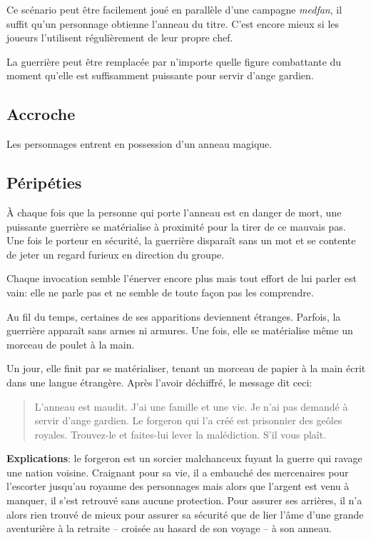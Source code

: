 \documentclass[a5paper,pagesize,10pt,bibliography=totoc,numbers=enddot,
headings=normal,DIV=9,twoside=false,tablecaptionabove]{scrbook}
\begin{document}
Ce scénario peut être facilement joué en parallèle d'une campagne \emph{medfan}, il suffit qu'un personnage obtienne l'anneau du titre.
C'est encore mieux si les joueurs l'utilisent régulièrement de leur propre chef.

La guerrière peut être remplacée par n'importe quelle figure combattante du moment qu'elle est suffisamment puissante pour servir d'ange gardien.

\subsection*{Accroche}

Les personnages entrent en possession d'un anneau magique.

\subsection*{Péripéties}

À chaque fois que la personne qui porte l'anneau est en danger de mort, une puissante guerrière se matérialise à proximité pour la tirer de ce mauvais pas.
Une fois le porteur en sécurité, la guerrière disparaît sans un mot et se contente de jeter un regard furieux en direction du groupe.

Chaque invocation semble l'énerver encore plus mais tout effort de lui parler est vain: elle ne parle pas et ne semble de toute façon pas les comprendre.

Au fil du temps, certaines de ses apparitions deviennent étranges. Parfois, la guerrière apparaît sans armes ni armures.
Une fois, elle se matérialise même un morceau de poulet à la main.

Un jour, elle finit par se matérialiser, tenant un morceau de papier à la main écrit dans une langue étrangère.
Après l'avoir déchiffré, le message dit ceci:
\blockquote{L'anneau est maudit. J'ai une famille et une vie. Je n'ai pas demandé à servir d'ange gardien. Le forgeron qui l'a créé est prisonnier des geôles royales. Trouvez-le et faites-lui lever la malédiction. S'il vous plaît.}


\textbf{Explications}: le forgeron est un sorcier malchanceux fuyant la guerre qui ravage une nation voisine.
Craignant pour sa vie, il a embauché des mercenaires pour l'escorter jusqu'au royaume des personnages mais alors que l'argent est venu à manquer, il s'est retrouvé sans aucune protection.
Pour assurer ses arrières, il n'a alors rien trouvé de mieux pour assurer sa sécurité que de lier l'âme d'une grande aventurière à la retraite -- croisée au hasard de son voyage -- à son anneau.
\end{document}
